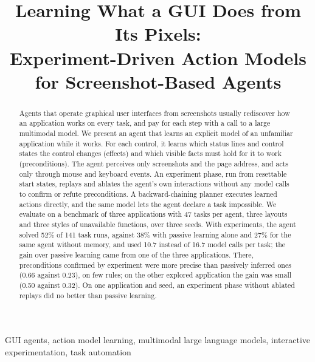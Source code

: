 \documentclass[conference]{IEEEtran}
\begin{document}
\title{Learning What a GUI Does from Its Pixels:\\Experiment-Driven Action Models for Screenshot-Based Agents}

\author{
}

\maketitle

\begin{abstract}
Agents that operate graphical user interfaces from screenshots usually rediscover how an application works on every task, and pay for each step with a call to a large multimodal model. We present an agent that learns an explicit model of an unfamiliar application while it works. For each control, it learns which status lines and control states the control changes (effects) and which visible facts must hold for it to work (preconditions). The agent perceives only screenshots and the page address, and acts only through mouse and keyboard events. An experiment phase, run from resettable start states, replays and ablates the agent's own interactions without any model calls to confirm or refute preconditions. A backward-chaining planner executes learned actions directly, and the same model lets the agent declare a task impossible. We evaluate on a benchmark of three applications with 47 tasks per agent, three layouts and three styles of unavailable functions, over three seeds. With experiments, the agent solved 52\% of 141 task runs, against 38\% with passive learning alone and 27\% for the same agent without memory, and used 10.7 instead of 16.7 model calls per task; the gain over passive learning came from one of the three applications. There, preconditions confirmed by experiment were more precise than passively inferred ones (0.66 against 0.23), on few rules; on the other explored application the gain was small (0.50 against 0.32). On one application and seed, an experiment phase without ablated replays did no better than passive learning.
\end{abstract}

\begin{IEEEkeywords}
GUI agents, action model learning, multimodal large language models, interactive experimentation, task automation
\end{IEEEkeywords}

\end{document}

